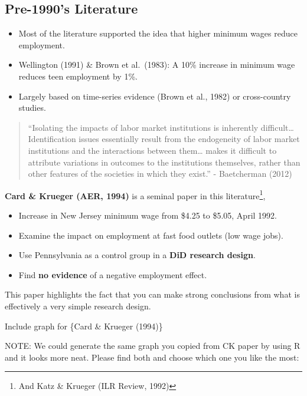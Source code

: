 \documentclass[
  letterpaper,
  DIV=11,
  numbers=noendperiod]{scrreprt}
\providecommand{\tightlist}{%
  \setlength{\itemsep}{0pt}\setlength{\parskip}{0pt}}\usepackage{longtable,booktabs,array}
\theoremstyle{definition}
\theoremstyle{remark}
\begin{document}
\hypertarget{pre-1990s-literature}{%
\subsection{Pre-1990's Literature}\label{pre-1990s-literature}}

\begin{itemize}
\tightlist
\item
  Most of the literature supported the idea that higher minimum wages
  reduce employment.
\item
  Wellington (1991) \& Brown et al.~(1983): A 10\% increase in minimum
  wage reduces teen employment by 1\%.
\item
  Largely based on time-series evidence (Brown et al., 1982) or
  cross-country studies.
\end{itemize}

\begin{quote}
``Isolating the impacts of labor market institutions is inherently
difficult\ldots{} Identification issues essentially result from the
endogeneity of labor market institutions and the interactions between
them\ldots{} makes it difficult to attribute variations in outcomes to
the institutions themselves, rather than other features of the societies
in which they exist.'' - Baetcherman (2012)
\end{quote}

\textbf{Card \& Krueger (AER, 1994)} is a seminal paper in this
literature\footnote{And Katz \& Krueger (ILR Review, 1992)},

\begin{itemize}
\tightlist
\item
  Increase in New Jersey minimum wage from \$4.25 to \$5.05, April 1992.
\item
  Examine the impact on employment at fast food outlets (low wage jobs).
\item
  Use Pennsylvania as a control group in a \textbf{DiD research design}.
\item
  Find \textbf{no evidence} of a negative employment effect.
\end{itemize}

This paper highlights the fact that you can make strong conclusions from
what is effectively a very simple research design.

Include graph for \{Card \& Krueger (1994)\}

NOTE: We could generate the same graph you copied from CK paper by using
R and it looks more neat. Please find both and choose which one you like
the most:\\
\end{document}
